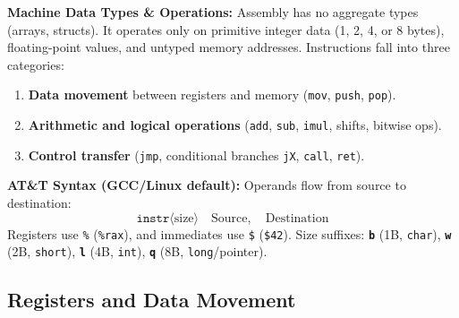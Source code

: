 \begin{remark}
    \textbf{Machine Data Types \& Operations:} Assembly has no aggregate types (arrays, structs). It operates only on primitive integer data (1, 2, 4, or 8 bytes), floating-point values, and untyped memory addresses. Instructions fall into three categories:
    \begin{enumerate}
        \item \textbf{Data movement} between registers and memory (\texttt{mov}, \texttt{push}, \texttt{pop}).
        \item \textbf{Arithmetic and logical operations} (\texttt{add}, \texttt{sub}, \texttt{imul}, shifts, bitwise ops).
        \item \textbf{Control transfer} (\texttt{jmp}, conditional branches \texttt{jX}, \texttt{call}, \texttt{ret}).
    \end{enumerate}
\end{remark}

\begin{remark}
    \textbf{AT\&T Syntax (GCC/Linux default):} Operands flow from source to destination:
    \[
        \texttt{instr}\langle\text{size}\rangle \quad \text{Source}, \quad \text{Destination}
    \]
    Registers use \texttt{\%} (\texttt{\%rax}), and immediates use \texttt{\$} (\texttt{\$42}). Size suffixes: \textbf{\texttt{b}} (1B, \texttt{char}), \textbf{\texttt{w}} (2B, \texttt{short}), \textbf{\texttt{l}} (4B, \texttt{int}), \textbf{\texttt{q}} (8B, \texttt{long}/pointer).
\end{remark}

\subsection{Registers and Data Movement}

